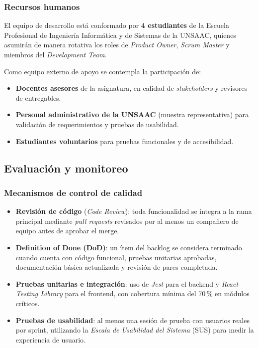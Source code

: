 \subsubsection{Recursos humanos}

El equipo de desarrollo está conformado por \textbf{4 estudiantes} de la
Escuela Profesional de Ingeniería Informática y de Sistemas de la UNSAAC,
quienes asumirán de manera rotativa los roles de \textit{Product Owner},
\textit{Scrum Master} y miembros del \textit{Development Team}.

Como equipo externo de apoyo se contempla la participación de:
\begin{itemize}
  \item \textbf{Docentes asesores} de la asignatura, en calidad de
    \textit{stakeholders} y revisores de entregables.
  \item \textbf{Personal administrativo de la UNSAAC} (muestra representativa)
    para validación de requerimientos y pruebas de usabilidad.
  \item \textbf{Estudiantes voluntarios} para pruebas funcionales y de
    accesibilidad.
\end{itemize}

\subsection{Evaluación y monitoreo}

\subsubsection{Mecanismos de control de calidad}

\begin{itemize}
  \item \textbf{Revisión de código} (\textit{Code Review}): toda funcionalidad
    se integra a la rama principal mediante \textit{pull requests} revisados por
    al menos un compañero de equipo antes de aprobar el merge.
  \item \textbf{Definition of Done (DoD)}: un ítem del backlog se considera
    terminado cuando cuenta con código funcional, pruebas unitarias aprobadas,
    documentación básica actualizada y revisión de pares completada.
  \item \textbf{Pruebas unitarias e integración}: uso de \textit{Jest} para el
    backend y \textit{React Testing Library} para el frontend, con cobertura
    mínima del 70\,\% en módulos críticos.
  \item \textbf{Pruebas de usabilidad}: al menos una sesión de prueba con usuarios
    reales por sprint, utilizando la \textit{Escala de Usabilidad del Sistema}
    (SUS) para medir la experiencia de usuario.
\end{itemize}


